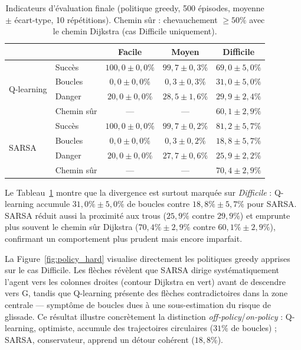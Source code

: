\documentclass{article}
\begin{document}
\begin{table}[H]
  \centering
  \begin{minipage}[c]{0.60\linewidth}
    \caption{Indicateurs d'évaluation finale (politique greedy, 500 épisodes, moyenne $\pm$ écart-type, 10 répétitions). Chemin sûr : chevauchement $\geq 50\%$ avec le chemin Dijkstra (cas Difficile uniquement).}
    \label{tab:eval}
    \scriptsize
    \begin{tabular}{llccc}
      \toprule
      & & \textbf{Facile} & \textbf{Moyen} & \textbf{Difficile} \\
      \midrule
      \multirow{4}{*}{Q-learning}
        & Succès      & $100{,}0 \pm 0{,}0\%$ & $99{,}7 \pm 0{,}3\%$ & $69{,}0 \pm 5{,}0\%$ \\
        & Boucles     & $0{,}0 \pm 0{,}0\%$   & $0{,}3 \pm 0{,}3\%$  & $31{,}0 \pm 5{,}0\%$ \\
        & Danger      & $20{,}0 \pm 0{,}0\%$  & $28{,}5 \pm 1{,}6\%$ & $29{,}9 \pm 2{,}4\%$ \\
        & Chemin sûr  & ---                   & ---                  & $60{,}1 \pm 2{,}9\%$ \\
      \midrule
      \multirow{4}{*}{SARSA}
        & Succès      & $100{,}0 \pm 0{,}0\%$ & $99{,}7 \pm 0{,}2\%$ & $81{,}2 \pm 5{,}7\%$ \\
        & Boucles     & $0{,}0 \pm 0{,}0\%$   & $0{,}3 \pm 0{,}2\%$  & $18{,}8 \pm 5{,}7\%$ \\
        & Danger      & $20{,}0 \pm 0{,}0\%$  & $27{,}7 \pm 0{,}6\%$ & $25{,}9 \pm 2{,}2\%$ \\
        & Chemin sûr  & ---                   & ---                  & $70{,}4 \pm 2{,}9\%$ \\
      \bottomrule
    \end{tabular}
  \end{minipage}\hfill
  \begin{minipage}[c]{0.37\linewidth}
    \small
    Le Tableau~\ref{tab:eval} montre que la divergence est surtout marquée sur \textit{Difficile} : Q-learning accumule $31{,}0\% \pm 5{,}0\%$ de boucles contre $18{,}8\% \pm 5{,}7\%$ pour SARSA. SARSA réduit aussi la proximité aux trous ($25{,}9\%$ contre $29{,}9\%$) et emprunte plus souvent le chemin sûr Dijkstra ($70{,}4\% \pm 2{,}9\%$ contre $60{,}1\% \pm 2{,}9\%$), confirmant un comportement plus prudent mais encore imparfait.
  \end{minipage}
\end{table}

La Figure~\ref{fig:policy_hard} visualise directement les politiques greedy apprises sur le cas Difficile. Les flèches révèlent que SARSA dirige systématiquement l'agent vers les colonnes droites (contour Dijkstra en vert) avant de descendre vers G, tandis que Q-learning présente des flèches contradictoires dans la zone centrale — symptôme de boucles dues à une sous-estimation du risque de glissade. Ce résultat illustre concrètement la distinction \textit{off-policy}/\textit{on-policy} : Q-learning, optimiste, accumule des trajectoires circulaires ($31\%$ de boucles) ; SARSA, conservateur, apprend un détour cohérent ($18{,}8\%$).
\end{document}
